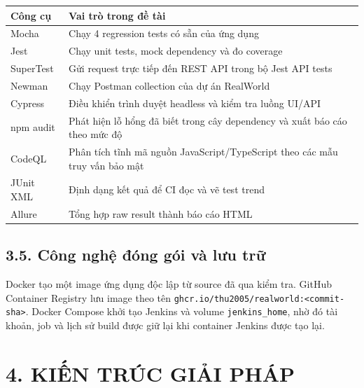 \documentclass[
  vietnamese,
  12pt,
  a4paper,
  oneside]{report}
\begin{document}
\begin{longtable}[]{@{}
  >{\raggedright\arraybackslash}p{}
  >{\raggedright\arraybackslash}p{}@{}}
\toprule\noalign{}
\begin{minipage}[b]{\linewidth}\raggedright
Công cụ
\end{minipage} & \begin{minipage}[b]{\linewidth}\raggedright
Vai trò trong đề tài
\end{minipage} \\
\midrule\noalign{}
\endhead
\bottomrule\noalign{}
\endlastfoot
Mocha & Chạy 4 regression tests có sẵn của ứng dụng \\
Jest & Chạy unit tests, mock dependency và đo coverage \\
SuperTest & Gửi request trực tiếp đến REST API trong bộ Jest API
tests \\
Newman & Chạy Postman collection của dự án RealWorld \\
Cypress & Điều khiển trình duyệt headless và kiểm tra luồng UI/API \\
npm audit & Phát hiện lỗ hổng đã biết trong cây dependency và xuất báo
cáo theo mức độ \\
CodeQL & Phân tích tĩnh mã nguồn JavaScript/TypeScript theo các mẫu truy
vấn bảo mật \\
JUnit XML & Định dạng kết quả để CI đọc và vẽ test trend \\
Allure & Tổng hợp raw result thành báo cáo HTML \\
\end{longtable}

\section{3.5. Công nghệ đóng gói và lưu
trữ}\label{35-cuxf4ng-nghux1ec7-ux111uxf3ng-guxf3i-vuxe0-lux1b0u-trux1eef}

Docker tạo một image ứng dụng độc lập từ source đã qua kiểm tra. GitHub
Container Registry lưu image theo tên
\nolinkurl{ghcr.io/thu2005/realworld:<commit-sha>}. Docker Compose khởi
tạo Jenkins và volume \texttt{jenkins\_home}, nhờ đó tài khoản, job và
lịch sử build được giữ lại khi container Jenkins được tạo lại.

\chapter{4. KIẾN TRÚC GIẢI
PHÁP}\label{4-kiux1ebfn-truxfac-giux1ea3i-phuxe1p}
\end{document}
